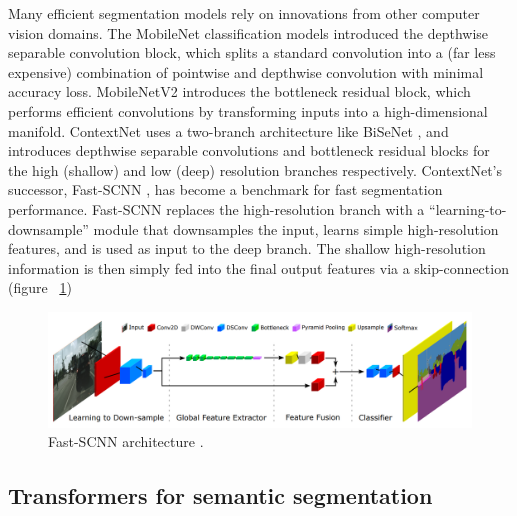 \documentclass[a4paper,12pt]{report}
\begin{document}
Many efficient segmentation models rely on innovations from other computer vision domains. The MobileNet \cite{howard_mobilenets_2017} classification models introduced the depthwise separable convolution block, which splits a standard convolution into a (far less expensive) combination of pointwise and depthwise convolution with minimal accuracy loss. MobileNetV2 \cite{sandler_mobilenetv2_2019} introduces the bottleneck residual block, which performs efficient convolutions by transforming inputs into a high-dimensional manifold. ContextNet \cite{poudel_contextnet_2018} uses a two-branch architecture like BiSeNet \cite{yu_bisenet_2018}, and introduces depthwise separable convolutions and bottleneck residual blocks for the high (shallow) and low (deep) resolution branches respectively. ContextNet’s successor, Fast-SCNN \cite{poudel_fast-scnn_2019}, has become a benchmark for fast segmentation performance. Fast-SCNN replaces the high-resolution branch with a “learning-to-downsample” module that downsamples the input, learns simple high-resolution features, and is used as input to the deep branch. The shallow high-resolution information is then simply fed into the final output features via a skip-connection (figure ~\ref{fig:fastscnn_architecture})

\begin{figure}[h]
    \centering
    \includegraphics[width=\textwidth]{res/fastscnn-architecture.png}
    \caption{Fast-SCNN architecture \cite{poudel_fast-scnn_2019}.}
    \label{fig:fastscnn_architecture}
\end{figure}

\subsection{Transformers for semantic segmentation}
\end{document}
